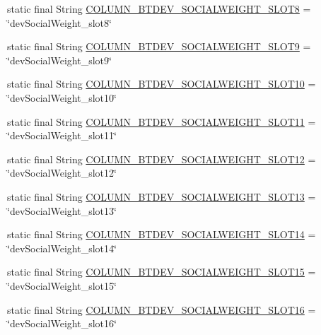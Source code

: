 \begin{DoxyCompactItemize}
static final String \hyperlink{classcs_1_1usense_1_1db_1_1_usense_s_q_lite_helper_a73f50eb2bf7bcb66f25f6d1b828b7945}{C\+O\+L\+U\+M\+N\+\_\+\+B\+T\+D\+E\+V\+\_\+\+S\+O\+C\+I\+A\+L\+W\+E\+I\+G\+H\+T\+\_\+\+S\+L\+O\+T8} = \char`\"{}dev\+Social\+Weight\+\_\+slot8\char`\"{}
\item 
static final String \hyperlink{classcs_1_1usense_1_1db_1_1_usense_s_q_lite_helper_ac1a5281961533f43ef335138a17324d4}{C\+O\+L\+U\+M\+N\+\_\+\+B\+T\+D\+E\+V\+\_\+\+S\+O\+C\+I\+A\+L\+W\+E\+I\+G\+H\+T\+\_\+\+S\+L\+O\+T9} = \char`\"{}dev\+Social\+Weight\+\_\+slot9\char`\"{}
\item 
static final String \hyperlink{classcs_1_1usense_1_1db_1_1_usense_s_q_lite_helper_a9e01ec3315f8580fd6b43fe4772463d6}{C\+O\+L\+U\+M\+N\+\_\+\+B\+T\+D\+E\+V\+\_\+\+S\+O\+C\+I\+A\+L\+W\+E\+I\+G\+H\+T\+\_\+\+S\+L\+O\+T10} = \char`\"{}dev\+Social\+Weight\+\_\+slot10\char`\"{}
\item 
static final String \hyperlink{classcs_1_1usense_1_1db_1_1_usense_s_q_lite_helper_a1a441f0ea325c883b38af3aee3ede3b0}{C\+O\+L\+U\+M\+N\+\_\+\+B\+T\+D\+E\+V\+\_\+\+S\+O\+C\+I\+A\+L\+W\+E\+I\+G\+H\+T\+\_\+\+S\+L\+O\+T11} = \char`\"{}dev\+Social\+Weight\+\_\+slot11\char`\"{}
\item 
static final String \hyperlink{classcs_1_1usense_1_1db_1_1_usense_s_q_lite_helper_a730aae9a2652f5d0f0267195db4232b9}{C\+O\+L\+U\+M\+N\+\_\+\+B\+T\+D\+E\+V\+\_\+\+S\+O\+C\+I\+A\+L\+W\+E\+I\+G\+H\+T\+\_\+\+S\+L\+O\+T12} = \char`\"{}dev\+Social\+Weight\+\_\+slot12\char`\"{}
\item 
static final String \hyperlink{classcs_1_1usense_1_1db_1_1_usense_s_q_lite_helper_a9f2c9eb09f629f6c4810ff4628329e97}{C\+O\+L\+U\+M\+N\+\_\+\+B\+T\+D\+E\+V\+\_\+\+S\+O\+C\+I\+A\+L\+W\+E\+I\+G\+H\+T\+\_\+\+S\+L\+O\+T13} = \char`\"{}dev\+Social\+Weight\+\_\+slot13\char`\"{}
\item 
static final String \hyperlink{classcs_1_1usense_1_1db_1_1_usense_s_q_lite_helper_ab720924820a995144fe9107832850fb2}{C\+O\+L\+U\+M\+N\+\_\+\+B\+T\+D\+E\+V\+\_\+\+S\+O\+C\+I\+A\+L\+W\+E\+I\+G\+H\+T\+\_\+\+S\+L\+O\+T14} = \char`\"{}dev\+Social\+Weight\+\_\+slot14\char`\"{}
\item 
static final String \hyperlink{classcs_1_1usense_1_1db_1_1_usense_s_q_lite_helper_a5a68038287d8342252a46d231b6169b5}{C\+O\+L\+U\+M\+N\+\_\+\+B\+T\+D\+E\+V\+\_\+\+S\+O\+C\+I\+A\+L\+W\+E\+I\+G\+H\+T\+\_\+\+S\+L\+O\+T15} = \char`\"{}dev\+Social\+Weight\+\_\+slot15\char`\"{}
\item 
static final String \hyperlink{classcs_1_1usense_1_1db_1_1_usense_s_q_lite_helper_a4bbfc33c1b2bbdd158e165be36b375ff}{C\+O\+L\+U\+M\+N\+\_\+\+B\+T\+D\+E\+V\+\_\+\+S\+O\+C\+I\+A\+L\+W\+E\+I\+G\+H\+T\+\_\+\+S\+L\+O\+T16} = \char`\"{}dev\+Social\+Weight\+\_\+slot16\char`\"{}

\end{DoxyCompactItemize}
